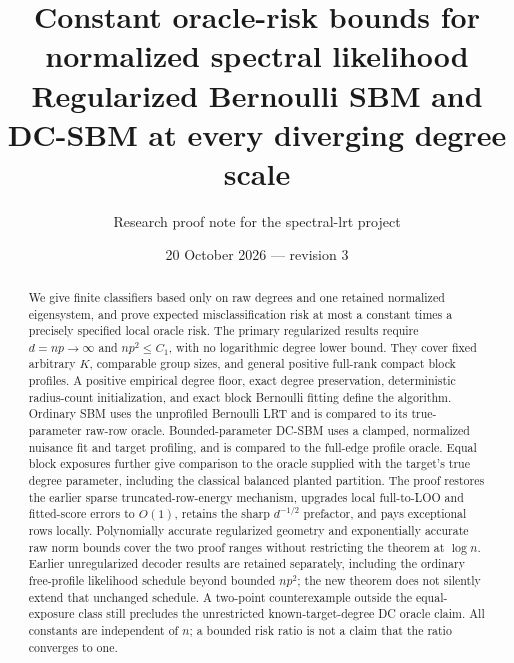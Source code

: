 \documentclass[11pt]{article}
\title{Constant oracle-risk bounds for normalized spectral likelihood\\
\large Regularized Bernoulli SBM and DC-SBM at every diverging degree scale}
\author{Research proof note for the spectral-lrt project}
\date{20 October 2026 --- revision 3}
\theoremstyle{definition}
\theoremstyle{remark}
\begin{document}
\maketitle
\begin{abstract}
We give finite classifiers based only on raw degrees and one retained
normalized eigensystem, and prove expected misclassification risk at
most a constant times a precisely specified local oracle risk.
The primary regularized results require \(d=np\to\infty\) and
\(np^2\le C_1\), with no logarithmic degree lower bound. They cover
fixed arbitrary \(K\), comparable group sizes, and general positive
full-rank compact block profiles. A positive empirical degree floor,
exact degree preservation, deterministic radius-count initialization,
and exact block Bernoulli fitting define the algorithm. Ordinary SBM
uses the unprofiled Bernoulli LRT and is compared to its true-parameter
raw-row oracle. Bounded-parameter DC-SBM uses a clamped, normalized
nuisance fit and target profiling, and is compared to the full-edge
profile oracle. Equal block exposures further give comparison to
the oracle supplied with the target's true degree parameter, including
the classical balanced planted partition.
The proof restores the earlier sparse truncated-row-energy mechanism,
upgrades local full-to-LOO and fitted-score errors to \(O(1)\), retains
the sharp \(d^{-1/2}\) prefactor, and pays exceptional rows locally.
Polynomially accurate regularized geometry and exponentially accurate
raw norm bounds cover the two proof ranges without restricting the
theorem at \(\log n\).
Earlier unregularized decoder results are retained separately, including
the ordinary free-profile likelihood schedule beyond bounded \(np^2\);
the new theorem does not silently extend that unchanged schedule.
A two-point counterexample outside the equal-exposure class still
precludes the unrestricted known-target-degree DC oracle claim.
All constants are independent of \(n\); a bounded risk ratio is not
a claim that the ratio converges to one.
\end{abstract}
\tableofcontents
\clearpage












\end{document}
